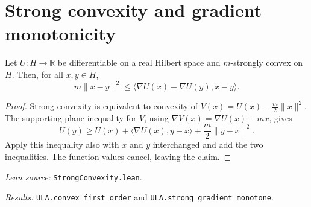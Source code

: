 \section{Strong convexity and gradient monotonicity}
\begin{lemma}\label{lem:monotone}
Let $U:H\to\mathbb R$ be differentiable on a real Hilbert space and
$m$-strongly convex on $H$. Then, for all $x,y\in H$,
\[
  m\|x-y\|^2\le
  \langle\nabla U(x)-\nabla U(y),x-y\rangle.
\]
\end{lemma}
\begin{proof}
Strong convexity is equivalent to convexity of
$V(x)=U(x)-\tfrac m2\|x\|^2$. The supporting-plane inequality for $V$,
using $\nabla V(x)=\nabla U(x)-mx$, gives
\[
 U(y)\ge U(x)+\langle\nabla U(x),y-x\rangle
                 +\frac m2\|y-x\|^2.
\]
Apply this inequality also with $x$ and $y$ interchanged and add the
two inequalities. The function values cancel, leaving the claim.
\end{proof}
{\small\raggedright
\textit{Lean source:} \texttt{StrongConvexity.lean}.\par
\textit{Results:} \texttt{ULA.convex\_first\_order} and
\texttt{ULA.strong\_gradient\_monotone}.\par}
